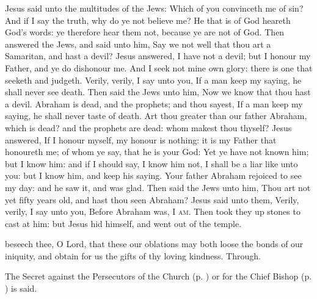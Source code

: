 

 Jesus said unto the multitudes of the Jews: Which of you convinceth me of sin? And if I say the truth, why do ye not believe me? He that is of God heareth God's words: ye therefore hear them not, because ye are not of God. Then answered the Jews, and said unto him, Say we not well that thou art a Samaritan, and hast a devil? Jesus answered, I have not a devil; but I honour my Father, and ye do dishonour me. And I seek not mine own glory: there is one that seeketh and judgeth. Verily, verily, I say unto you, If a man keep my saying, he shall never see death. Then said the Jews unto him, Now we know that thou hast a devil. Abraham is dead, and the prophets; and thou sayest, If a man keep my saying, he shall never taste of death. Art thou greater than our father Abraham, which is dead? and the prophets are dead: whom makest thou thyself? Jesus answered, If I honour myself, my honour is nothing: it is my Father that honoureth me; of whom ye say, that he is your God: Yet ye have not known him; but I know him: and if I should say, I know him not, I shall be a liar like unto you: but I know him, and keep his saying. Your father Abraham rejoiced to see my day: and he saw it, and was glad. Then said the Jews unto him, Thou art not yet fifty years old, and hast thou seen Abraham? Jesus said unto them, Verily, verily, I say unto you, Before Abraham was, \textsc{I am}. Then took they up stones to cast at him: but Jesus hid himself, and went out of the temple.

\secret
{} beseech thee, O Lord, that these our oblations may both loose the bonds of our iniquity, and obtain for us the gifts of thy loving kindness. Through.
\begin{rubric}
    The Secret against the Persecutors of the Church (p. \pageref{SPAgainst}) or for the Chief Bishop (p. \pageref{SPChiefBishop}) is said.
\end{rubric}

